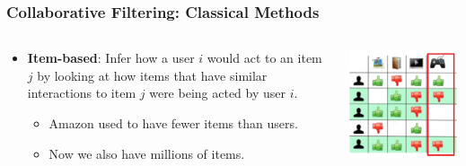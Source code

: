 \documentclass[11pt]{beamer}
\begin{document}
	\begin{frame}
		\frametitle{Collaborative Filtering: Classical Methods}
		\begin{columns}
			\begin{column}{0.5\textwidth}
				\begin{itemize}
					\item \textbf{\alert<1>{Item}-based}: Infer how a user $i$ would act to an item $j$ by looking at how \alert<1>{items} that have similar interactions to \alert<1>{item $j$} were being acted by \alert<1>{user $i$}.
					\begin{itemize}
						\item Amazon used to have fewer items than users.
						\item<2-> Now we also have millions of items.
					\end{itemize}
				\end{itemize}
			\end{column}
			\begin{column}{0.5\textwidth}
				\begin{center}
					\centering
					\includegraphics[width=\textwidth]{images/cf-stage3-alter.png}
				\end{center}
			\end{column}
		\end{columns}
	\end{frame}
\end{document}
